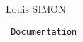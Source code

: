 Louis S\+I\+M\+ON

\href{https://github.com/LouisSimon20/cplusplus/morse/html/index.html}{\texttt{ Documentation}} 